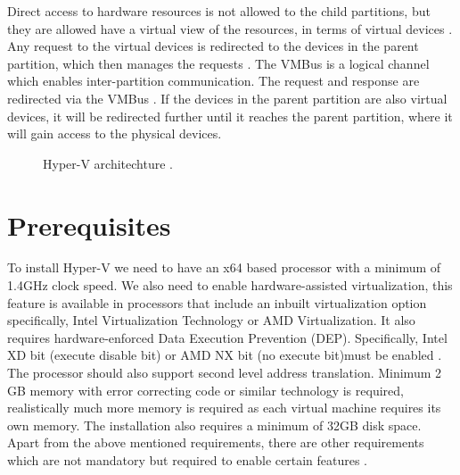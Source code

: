 \documentclass[9pt,twocolumn,twoside]{../../styles/osajnl}
\begin{document}
Direct access to hardware resources is not allowed to the child
partitions, but they are allowed have a virtual view of the resources,
in terms of virtual devices \cite{www-hyperv-architecture}. Any
request to the virtual devices is redirected to the devices in the
parent partition, which then manages the requests
\cite{www-hyperv-architecture}. The VMBus is a logical channel which
enables inter-partition communication. The request and response are
redirected via the VMBus \cite{www-hyperv-architecture}. If the
devices in the parent partition are also virtual devices, it will be
redirected further until it reaches the parent partition, where it
will gain access to the physical devices.

\begin{figure}[htbp]
\centering
{}
\caption{Hyper-V architechture \cite{www-hyperv-wikipedia}.}
\label{fig:false-color}
\end{figure}

\section{Prerequisites}

To install Hyper-V we need to have an x64 based processor with a
minimum of 1.4GHz clock speed. We also need to enable
hardware-assisted virtualization, this feature is available in
processors that include an inbuilt virtualization option specifically,
Intel Virtualization Technology or AMD Virtualization. It also
requires hardware-enforced Data Execution Prevention
(DEP). Specifically, Intel XD bit (execute disable bit) or AMD NX bit
(no execute bit)must be enabled \cite{www-hyperv-paper2}. The
processor should also support second level address
translation. Minimum 2 GB memory with error correcting code or similar
technology is required, realistically much more memory is required as
each virtual machine requires its own memory. The installation also
requires a minimum of 32GB disk space. Apart from the above mentioned
requirements, there are other requirements which are not mandatory but
required to enable certain features \cite{www-hyperv-wikipedia}.
\end{document}
